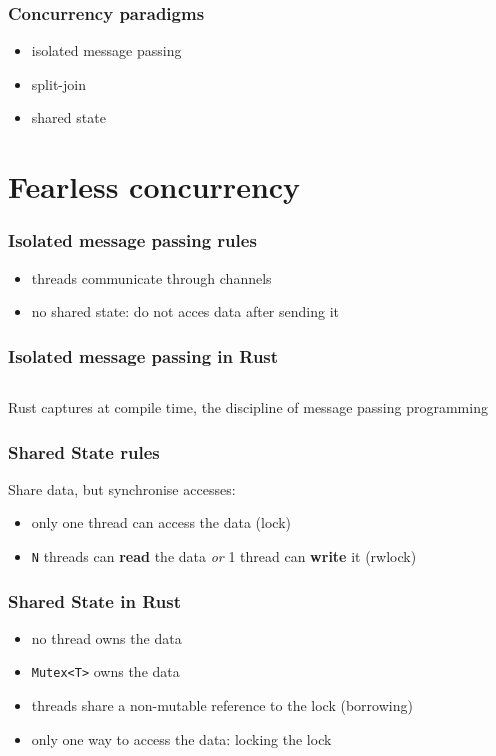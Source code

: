 \documentclass{beamer}
\begin{document}
\begin{frame}
    \frametitle{Concurrency paradigms}
    \begin{itemize}
        \item isolated message passing
        \item split-join
        \item shared state
    \end{itemize}
\end{frame}

\section{Fearless concurrency}


\begin{frame}
    \frametitle{Isolated message passing rules}
    \begin{itemize}
        \item threads communicate through channels
        \item no shared state: do not acces data after sending it
    \end{itemize}
\end{frame}

\begin{frame}
    \frametitle{Isolated message passing in Rust}
    \inputminted[fontsize=\tiny]{rust}{code/isolated_message_passing.rs}
\end{frame}

\begin{frame}
    Rust captures at compile time, the discipline of message passing programming
\end{frame}

\begin{frame}
    \frametitle{Shared State rules}
    Share data, but synchronise accesses:
    \begin{itemize}
        \item only one thread can access the data (lock)
        \item \texttt{N} threads can \textbf{read} the data \textit{or} 1 thread can \textbf{write} it (rwlock)
    \end{itemize}
\end{frame}

\begin{frame}
    \frametitle{Shared State in Rust}
        \begin{itemize}
            \item no thread owns the data
            \item \texttt{Mutex<T>} owns the data
            \item threads share a non-mutable reference to the lock (borrowing)
            \item only one way to access the data: locking the lock
        \end{itemize}
        \vspace{1.5em}
        \inputminted{rust}{code/lock.rs}
\end{frame}
\end{document}
